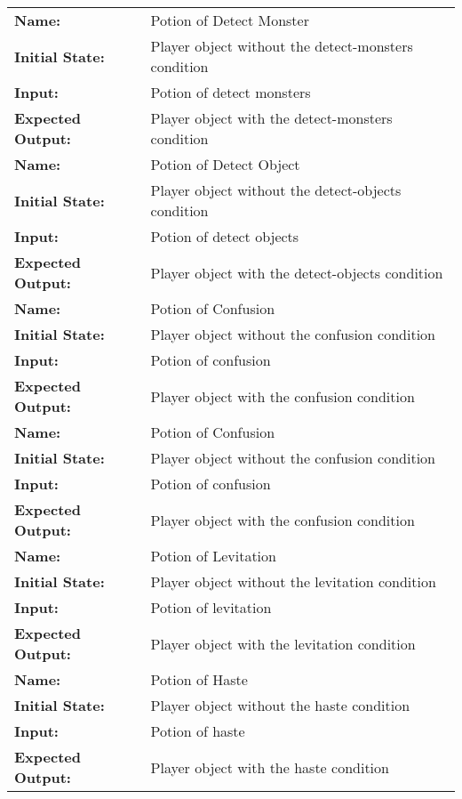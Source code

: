 \documentclass[12pt, titlepage]{article}
\begin{document}
\begin{center}
\begin{longtable}{ l | p{10cm} }
				\hline
				\rule{0pt}{2em}\textbf{Name:} & Potion of Detect Monster\\
				\textbf{Initial State:} & Player object without the detect-monsters condition\\
				\textbf{Input:} & Potion of detect monsters\\
				\textbf{Expected Output:} & Player object with the detect-monsters condition\\[1em]
				\hline
				\rule{0pt}{2em}\textbf{Name:} & Potion of Detect Object\\
				\textbf{Initial State:} & Player object without the detect-objects condition\\
				\textbf{Input:} & Potion of detect objects\\
				\textbf{Expected Output:} & Player object with the detect-objects condition\\[1em]
				\hline
				\rule{0pt}{2em}\textbf{Name:} & Potion of Confusion\\
				\textbf{Initial State:} & Player object without the confusion condition\\
				\textbf{Input:} & Potion of confusion\\
				\textbf{Expected Output:} & Player object with the confusion condition\\[1em]
				\hline
				\rule{0pt}{2em}\textbf{Name:} & Potion of Confusion\\
				\textbf{Initial State:} & Player object without the confusion condition\\
				\textbf{Input:} & Potion of confusion\\
				\textbf{Expected Output:} & Player object with the confusion condition\\[1em]
				\hline
				\rule{0pt}{2em}\textbf{Name:} & Potion of Levitation\\
				\textbf{Initial State:} & Player object without the levitation condition\\
				\textbf{Input:} & Potion of levitation\\
				\textbf{Expected Output:} & Player object with the levitation condition\\[1em]
				\hline
				\rule{0pt}{2em}\textbf{Name:} & Potion of Haste\\
				\textbf{Initial State:} & Player object without the haste condition\\
				\textbf{Input:} & Potion of haste\\
				\textbf{Expected Output:} & Player object with the haste condition\\[1em]

\end{longtable}
\end{center}
\end{document}
